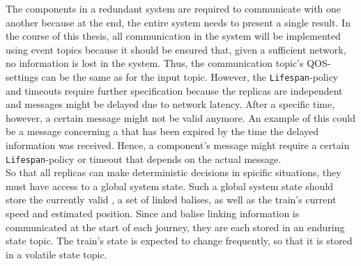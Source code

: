 The components in a redundant system are required to communicate with one another because at the end, the entire system needs to present a single result.
In the course of this thesis, all communication in the system will be implemented using  event topics because it should be ensured that, given a sufficient network, no information is lost in the system.
Thus, the communication topic's \gls*{QOS}-settings can be the same as for the input topic.
However, the \texttt{Lifespan}-policy and timeouts require further specification because the replicas are independent and messages might be delayed due to network latency.
After a specific time, however, a certain message might not be valid anymore.
An example of this could be a message concerning a  that has been expired by the time the delayed information was received.
Hence, a component's message might require a certain \texttt{Lifespan}-policy or timeout that depends on the actual message.
\\

So that all replicas can make deterministic decisions in spicific situations, they must have access to a global system state.
Such a global system state should store the currently valid , a set of linked balises, as well as the train's current speed and estimated position.
Since  and balise linking information is communicated at the start of each journey, they are each stored in an enduring  state topic.
The train's state is expected to change frequently, so that it is stored in a volatile  state topic.